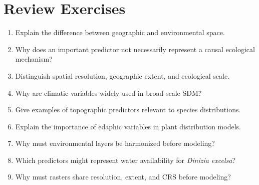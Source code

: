 \section{Review Exercises}

\begin{enumerate}
  \item Explain the difference between geographic and environmental space.
  \item Why does an important predictor not necessarily represent a causal ecological mechanism?
  \item Distinguish spatial resolution, geographic extent, and ecological scale.
  \item Why are climatic variables widely used in broad-scale SDM?
  \item Give examples of topographic predictors relevant to species distributions.
  \item Explain the importance of edaphic variables in plant distribution models.
  \item Why must environmental layers be harmonized before modeling?
  \item Which predictors might represent water availability for \textit{Dinizia excelsa}?
  \item Why must rasters share resolution, extent, and CRS before modeling?
\end{enumerate}
